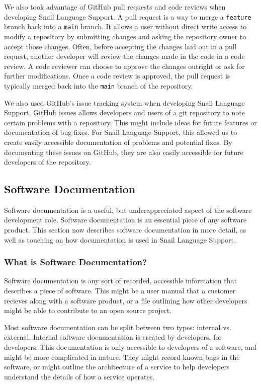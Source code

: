 \documentclass{article}
\begin{document}
We also took advantage of GitHub pull requests and code reviews when developing Snail Language Support. A pull request is a way to merge a \lstinline{feature} branch back into a \lstinline{main} branch. It allows a user without direct write access to modify a repository by submitting changes and asking the repository owner to accept those changes. Often, before accepting the changes laid out in a pull request, another developer will review the changes made in the code in a code review. A code reviewer can choose to approve the changes outright or ask for further modifications. Once a code review is approved, the pull request is typically merged back into the \lstinline{main} branch of the repository. 

We also used GitHub's issue tracking system when developing Snail Language Support. GitHub issues allows developers and users of a git repository to note certain problems with a repository. This might include ideas for future features or documentation of bug fixes. For Snail Language Support, this allowed us to create easily accessible documentation of problems and potential fixes. By documenting these issues on GitHub, they are also easily accessible for future developers of the repository. 

\subsection{Software Documentation}

Software documentation is a useful, but underappreciated aspect of the software development role. Software documentation is an essential piece of any software product. This section now describes software documentation in more detail, as well as touching on how documentation is used in Snail Language Support.

\subsubsection{What is Software Documentation?}

Software documentation is any sort of recorded, accessible information that describes a piece of software. This might be a user manual that a customer recieves along with a software product, or a file outlining how other developers might be able to contribute to an open source project. 

Most software documentation can be split between two types: internal vs. external. Internal software documentation is created by developers, for developers. This documentation is only accessible to developers of a software, and might be more complicated in nature. They might record known bugs in the software, or might outline the architecture of a service to help developers understand the details of how a service operates.
\end{document}
